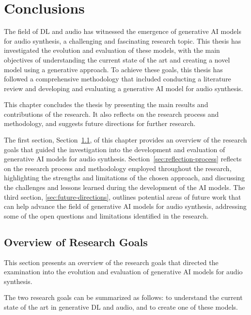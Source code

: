 \chapter{Conclusions} \label{chap:concl}

\minitoc

The field of \ac{DL} and audio has witnessed the emergence of generative \ac{AI} models for audio synthesis, a challenging and fascinating research topic. This thesis has investigated the evolution and evaluation of these models, with the main objectives of understanding the current state of the art and creating a novel model using a generative approach. To achieve these goals, this thesis has followed a comprehensive methodology that included conducting a literature review and developing and evaluating a generative \ac{AI} model for audio synthesis.

This chapter concludes the thesis by presenting the main results and contributions of the research. It also reflects on the research process and methodology, and suggests future directions for further research.

The first section, Section~\ref{sec:reflection-goals}, of this chapter provides an overview of the research goals that guided the investigation into the development and evaluation of generative \ac{AI} models for audio synthesis. Section~\ref{sec:reflection-process} reflects on the research process and methodology employed throughout the research, highlighting the strengths and limitations of the chosen approach, and discussing the challenges and lessons learned during the development of the \ac{AI} models. The third section, \ref{sec:future-directions}, outlines potential areas of future work that can help advance the field of generative \ac{AI} models for audio synthesis, addressing some of the open questions and limitations identified in the research.

\section{Overview of Research Goals} \label{sec:reflection-goals}

This section presents an overview of the research goals that directed the examination into the evolution and evaluation of generative \ac{AI} models for audio synthesis.

The two research goals can be summarized as follows: to understand the current state of the art in generative \ac{DL} and audio, and to create one of these models.

